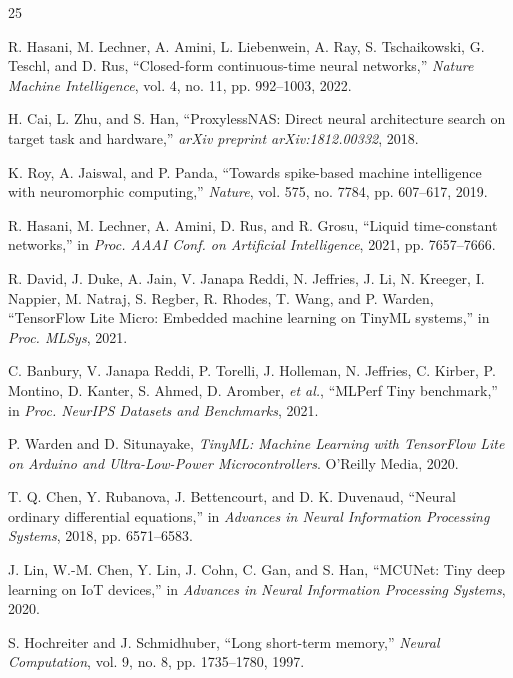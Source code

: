 \documentclass[conference]{IEEEtran}
\begin{document}
\begin{thebibliography}{25}

 R. Hasani, M. Lechner, A. Amini, L. Liebenwein, A. Ray, S. Tschaikowski, G. Teschl, and D. Rus, ``Closed-form continuous-time neural networks,'' \textit{Nature Machine Intelligence}, vol. 4, no. 11, pp. 992--1003, 2022.

 H. Cai, L. Zhu, and S. Han, ``ProxylessNAS: Direct neural architecture search on target task and hardware,'' \textit{arXiv preprint arXiv:1812.00332}, 2018.

 K. Roy, A. Jaiswal, and P. Panda, ``Towards spike-based machine intelligence with neuromorphic computing,'' \textit{Nature}, vol. 575, no. 7784, pp. 607--617, 2019.

 R. Hasani, M. Lechner, A. Amini, D. Rus, and R. Grosu, ``Liquid time-constant networks,'' in \textit{Proc. AAAI Conf. on Artificial Intelligence}, 2021, pp. 7657--7666.

 R. David, J. Duke, A. Jain, V. Janapa Reddi, N. Jeffries, J. Li, N. Kreeger, I. Nappier, M. Natraj, S. Regber, R. Rhodes, T. Wang, and P. Warden, ``TensorFlow Lite Micro: Embedded machine learning on TinyML systems,'' in \textit{Proc. MLSys}, 2021.

 C. Banbury, V. Janapa Reddi, P. Torelli, J. Holleman, N. Jeffries, C. Kirber, P. Montino, D. Kanter, S. Ahmed, D. Aromber, \textit{et al.}, ``MLPerf Tiny benchmark,'' in \textit{Proc. NeurIPS Datasets and Benchmarks}, 2021.

 P. Warden and D. Situnayake, \textit{TinyML: Machine Learning with TensorFlow Lite on Arduino and Ultra-Low-Power Microcontrollers}. O'Reilly Media, 2020.

 T. Q. Chen, Y. Rubanova, J. Bettencourt, and D. K. Duvenaud, ``Neural ordinary differential equations,'' in \textit{Advances in Neural Information Processing Systems}, 2018, pp. 6571--6583.

 J. Lin, W.-M. Chen, Y. Lin, J. Cohn, C. Gan, and S. Han, ``MCUNet: Tiny deep learning on IoT devices,'' in \textit{Advances in Neural Information Processing Systems}, 2020.

 S. Hochreiter and J. Schmidhuber, ``Long short-term memory,'' \textit{Neural Computation}, vol. 9, no. 8, pp. 1735--1780, 1997.


\end{thebibliography}
\end{document}
